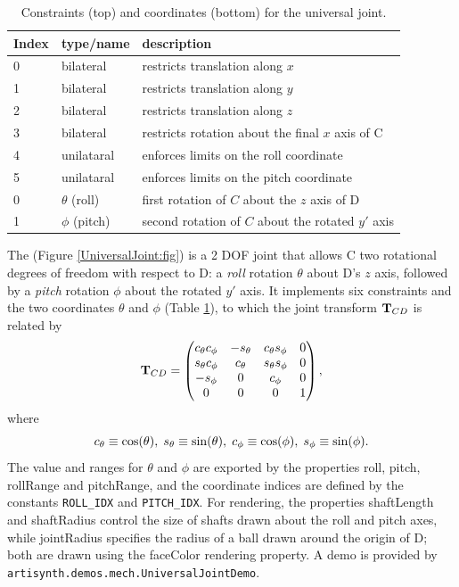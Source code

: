 \begin{table}[h]
\centering
\begin{tabular}{|l|l|l|}
\hline
Index & type/name & description \\
\hline
0 & bilateral & restricts translation along $x$ \\
1 & bilateral & restricts translation along $y$ \\
2 & bilateral & restricts translation along $z$ \\
3 & bilateral & restricts rotation about the final $x$ axis of C \\
4 & unilataral & enforces limits on the roll coordinate \\
5 & unilataral & enforces limits on the pitch coordinate \\
\hline
\hline
0 & $\theta$ (roll) & first rotation of $C$ about the $z$ axis of D \\
1 & $\phi$ (pitch) & second rotation of $C$ about the rotated $y'$ axis \\
\hline
\end{tabular}
\caption{Constraints (top) and coordinates (bottom) for the universal joint.}
\label{UniversalConstraints:tbl}
\end{table}

The  
(Figure \ref{UniversalJoint:fig}) is a 2 DOF joint
that allows C two rotational degrees of freedom with respect to D: a
{\it roll} rotation $\theta$ about D's $z$ axis, followed by a {\it
pitch} rotation $\phi$ about the rotated $y'$ axis. It implements six
constraints and the two coordinates $\theta$ and $\phi$
(Table \ref{UniversalConstraints:tbl}), to which the joint transform
${\bf T}_{CD}$ is related by
%
\begin{equation*}
{\bf T}_{CD} = \left(\begin{matrix}
c_\theta c_\phi & -s_\theta & c_\theta s_\phi & 0 \\
s_\theta c_\phi & c_\theta & s_\theta s_\phi & 0 \\
-s_\phi & 0 & c_\phi & 0 \\
0 & 0 & 0 & 1 
\end{matrix}\right),
\end{equation*}
where 
%
\begin{equation*}
c_\theta \equiv \cos(\theta),\; 
s_\theta \equiv \sin(\theta),\;
c_\phi \equiv \cos(\phi),\;
s_\phi \equiv \sin(\phi).
\end{equation*}
%
The value and ranges for $\theta$ and $\phi$ are exported by the
properties {\sf roll}, {\sf pitch}, {\sf rollRange} and {\sf
pitchRange}, and the coordinate indices are defined by the constants
{\tt ROLL\_IDX} and {\tt PITCH\_IDX}.  For rendering, the properties
{\sf shaftLength} and {\sf shaftRadius} control the size of shafts
drawn about the roll and pitch axes, while {\sf jointRadius} specifies
the radius of a ball drawn around the origin of D; both are drawn
using the {\sf faceColor} rendering property. A demo is provided by
{\tt artisynth.demos.mech.UniversalJointDemo}.

